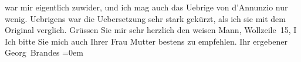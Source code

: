 \begin{ledgroupsized}[t]{13cm}
                    war mir eigentlich zuwider, und ich mag auch das Uebrige von d’Annunzio nur wenig. Uebrigens war die
                    Uebersetzung sehr stark gekürzt, als ich sie mit dem Original verglich. Grüssen
                    Sie mir sehr herzlich den weisen Mann,
                        Wollzeile 15, I\pend
           \pstart
           Ich bitte Sie mich auch Ihrer Frau Mutter
                    bestens zu empfehlen.\pend
           \pstart
           Ihr ergebener{\\[\baselineskip]}\spacefill\mbox{Georg Brandes}\pend
           \leftskip=0em{}
         
         \endnumbering{}\end{ledgroupsized}  \newcommand{\dateiname}{L00784}\newcommand{\titel}{Georg Brandes an Arthur Schnitzler, 16. 3. 1898}\newcommand{\editorInnen}{Martin Anton Müller und Gerd-Hermann Susen}
      